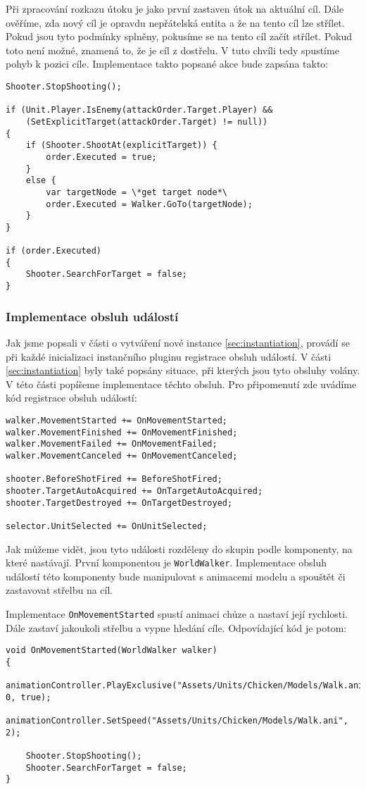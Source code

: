 Při zpracování rozkazu útoku je jako první zastaven útok na aktuální cíl. Dále ověříme, zda nový cíl je opravdu nepřátelská entita a že na tento cíl lze střílet. Pokud jsou tyto podmínky splněny, pokusíme se na tento cíl začít střílet. Pokud toto není možné, znamená to, že je cíl z dostřelu. V tuto chvíli tedy spustíme pohyb k pozici cíle. Implementace takto popsané akce bude zapsána takto:
\begin{lstlisting}
Shooter.StopShooting();

if (Unit.Player.IsEnemy(attackOrder.Target.Player) && 
	(SetExplicitTarget(attackOrder.Target) != null))
{
	if (Shooter.ShootAt(explicitTarget)) {
		order.Executed = true;
	}
	else {
		var targetNode = \*get target node*\ 
		order.Executed = Walker.GoTo(targetNode);
	} 
}

if (order.Executed)
{
	Shooter.SearchForTarget = false;
}
\end{lstlisting}

\subsubsection{Implementace obsluh událostí}
\label{sec:eventhandlers}

Jak jsme popsali v části o vytváření nové instance \ref{sec:instantiation}, provádí se při každé inicializaci instančního pluginu registrace obsluh událostí. V části \ref{sec:instantiation} byly také popsány situace, při kterých jsou tyto obsluhy volány. V této části popíšeme implementace těchto obsluh. Pro připomenutí zde uvádíme kód registrace obsluh událostí:
\begin{lstlisting}
walker.MovementStarted += OnMovementStarted;
walker.MovementFinished += OnMovementFinished;
walker.MovementFailed += OnMovementFailed;
walker.MovementCanceled += OnMovementCanceled;

shooter.BeforeShotFired += BeforeShotFired;
shooter.TargetAutoAcquired += OnTargetAutoAcquired;
shooter.TargetDestroyed += OnTargetDestroyed;

selector.UnitSelected += OnUnitSelected;
\end{lstlisting}

Jak můžeme vidět, jsou tyto události rozděleny do skupin podle komponenty, na které nastávají. První komponentou je \texttt{WorldWalker}. Implementace obsluh událostí této komponenty bude manipulovat s animacemi modelu a spouštět či zastavovat střelbu na cíl.

Implementace \texttt{OnMovementStarted} spustí animaci chůze a nastaví její rychlosti. Dále zastaví jakoukoli střelbu a vypne hledání cíle. Odpovídající kód je potom:
\begin{lstlisting}
void OnMovementStarted(WorldWalker walker)
{
	animationController.PlayExclusive("Assets/Units/Chicken/Models/Walk.ani", 0, true);
	animationController.SetSpeed("Assets/Units/Chicken/Models/Walk.ani", 2);

	Shooter.StopShooting();
	Shooter.SearchForTarget = false;
}
\end{lstlisting}

